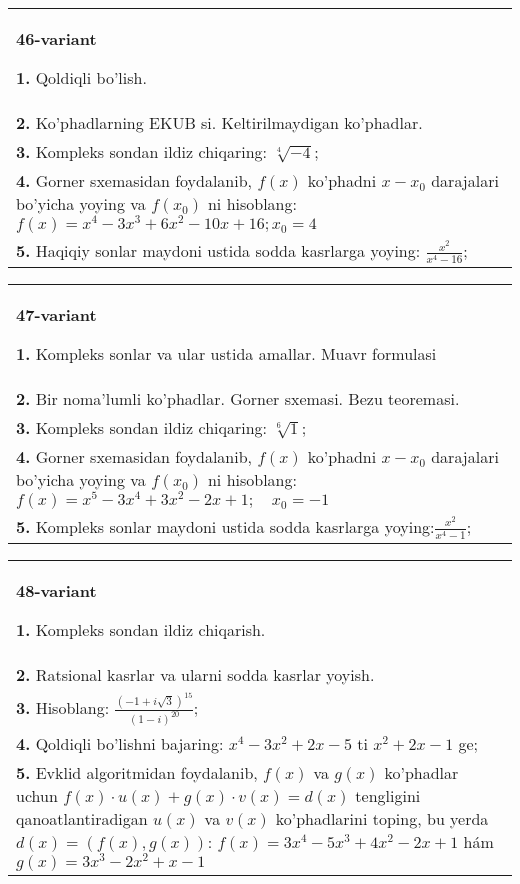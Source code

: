 \documentclass{article}
\begin{document}
\begin{tabular}{m{17cm}}
\textbf{46-variant}
\newline

\textbf{1.} Qoldiqli bo’lish.  \\
\textbf{2.} Ko’phadlarning EKUB si. Keltirilmaydigan ko’phadlar. \\
\textbf{3.} Kompleks sondan ildiz chiqaring: $\sqrt[4]{-4}$; \\
\textbf{4.} Gorner sxemasidan foydalanib, $f(x)$ ko’phadni $x-x_0$ darajalari bo’yicha yoying va $f\left(x_0\right)$ ni hisoblang: $f(x)=x^4-3 x^3+6 x^2-10 x+16 ; x_0=4$ \\
\textbf{5.} Haqiqiy sonlar maydoni ustida sodda kasrlarga yoying:  $\frac{x^2}{x^4-16}$; \\

\end{tabular}
\vspace{1cm}


\begin{tabular}{m{17cm}}
\textbf{47-variant}
\newline

\textbf{1.} Kompleks sonlar va ular ustida amallar. Muavr formulasi  \\
\textbf{2.} Bir noma’lumli ko’phadlar. Gorner sxemasi. Bezu teoremasi.  \\
\textbf{3.} Kompleks sondan ildiz chiqaring: $\sqrt[6]{1}$; \\
\textbf{4.} Gorner sxemasidan foydalanib, $f(x)$ ko’phadni $x-x_0$ darajalari bo’yicha yoying va $f\left(x_0\right)$ ni hisoblang: $f(x)=x^5-3 x^4+3 x^2-2 x+1 ; \quad x_0=-1$ \\
\textbf{5.} Kompleks sonlar maydoni ustida sodda kasrlarga yoying:$\frac{x^2}{x^4-1}$; \\

\end{tabular}
\vspace{1cm}


\begin{tabular}{m{17cm}}
\textbf{48-variant}
\newline

\textbf{1.} Kompleks sondan ildiz chiqarish. \\
\textbf{2.} Ratsional kasrlar va ularni sodda kasrlar yoyish. \\
\textbf{3.} Hisoblang:  $\frac{(-1+i \sqrt{3})^{15}}{(1-i)^{20}}$; \\
\textbf{4.} Qoldiqli bo’lishni bajaring: $x^4-3 x^2+2 x-5$ ti $x^2+2 x-1$ ge; \\
\textbf{5.} Evklid algoritmidan foydalanib, $f(x)$ va $g(x)$ ko’phadlar uchun $f(x) \cdot u(x)+g(x) \cdot v(x)=d(x)$ tengligini qanoatlantiradigan $u(x)$ va $v(x)$ ko’phadlarini toping, bu yerda $d(x)=(f(x), g(x))$:  $f(x)=3 x^4-5 x^3+4 x^2-2 x+1$ hám $g(x)=3 x^3-2 x^2+x-1$ \\

\end{tabular}
\vspace{1cm}
\end{document}

